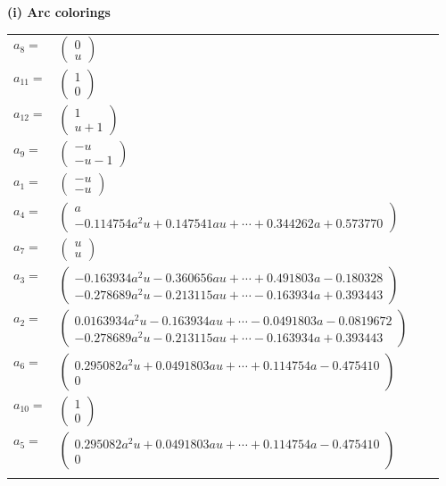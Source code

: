 \documentclass[1p]{elsarticle_modified}
\theoremstyle{definition}
\begin{document}
\flushleft \textbf{(i) Arc colorings}\\
\begin{tabular}{m{7pt} m{180pt} m{7pt} m{180pt} }
\flushright $a_{8}=$&$\begin{pmatrix}0\\u\end{pmatrix}$ \\
\flushright $a_{11}=$&$\begin{pmatrix}1\\0\end{pmatrix}$ \\
\flushright $a_{12}=$&$\begin{pmatrix}1\\u+1\end{pmatrix}$ \\
\flushright $a_{9}=$&$\begin{pmatrix}- u\\- u-1\end{pmatrix}$ \\
\flushright $a_{1}=$&$\begin{pmatrix}- u\\- u\end{pmatrix}$ \\
\flushright $a_{4}=$&$\begin{pmatrix}a\\-0.114754 a^{2} u+0.147541 a u+\cdots+0.344262 a+0.573770\end{pmatrix}$ \\
\flushright $a_{7}=$&$\begin{pmatrix}u\\u\end{pmatrix}$ \\
\flushright $a_{3}=$&$\begin{pmatrix}-0.163934 a^{2} u-0.360656 a u+\cdots+0.491803 a-0.180328\\-0.278689 a^{2} u-0.213115 a u+\cdots-0.163934 a+0.393443\end{pmatrix}$ \\
\flushright $a_{2}=$&$\begin{pmatrix}0.0163934 a^{2} u-0.163934 a u+\cdots-0.0491803 a-0.0819672\\-0.278689 a^{2} u-0.213115 a u+\cdots-0.163934 a+0.393443\end{pmatrix}$ \\
\flushright $a_{6}=$&$\begin{pmatrix}0.295082 a^{2} u+0.0491803 a u+\cdots+0.114754 a-0.475410\\0\end{pmatrix}$ \\
\flushright $a_{10}=$&$\begin{pmatrix}1\\0\end{pmatrix}$ \\
\flushright $a_{5}=$&$\begin{pmatrix}0.295082 a^{2} u+0.0491803 a u+\cdots+0.114754 a-0.475410\\0\end{pmatrix}$\\&\end{tabular}
\end{document}
